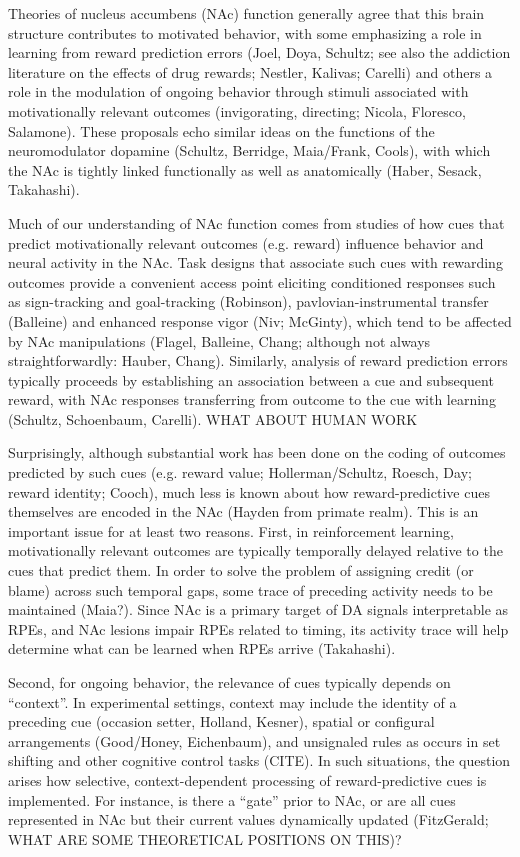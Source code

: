 \documentclass[11pt]{article}
\begin{document}
Theories of nucleus accumbens (NAc) function generally agree that this brain structure contributes to motivated behavior, with some emphasizing a role in learning from reward prediction errors (Joel, Doya, Schultz; see also the addiction literature on the effects of drug rewards; Nestler, Kalivas; Carelli) and others a role in the modulation of ongoing behavior through stimuli associated with motivationally relevant outcomes (invigorating, directing; Nicola, Floresco, Salamone). These proposals echo similar ideas on the functions of the neuromodulator dopamine (Schultz, Berridge, Maia/Frank, Cools), with which the NAc is tightly linked functionally as well as anatomically (Haber, Sesack, Takahashi).

Much of our understanding of NAc function comes from studies of how cues that predict motivationally relevant outcomes (e.g. reward) influence behavior and neural activity in the NAc. Task designs that associate such cues with rewarding outcomes provide a convenient access point eliciting conditioned responses such as sign-tracking and goal-tracking (Robinson), pavlovian-instrumental transfer (Balleine) and enhanced response vigor (Niv; McGinty), which tend to be affected by NAc manipulations (Flagel, Balleine, Chang; although not always straightforwardly: Hauber, Chang). Similarly, analysis of reward prediction errors typically proceeds by establishing an association between a cue and subsequent reward, with NAc responses transferring from outcome to the cue with learning (Schultz, Schoenbaum, Carelli). WHAT ABOUT HUMAN WORK

Surprisingly, although substantial work has been done on the coding of outcomes predicted by such cues (e.g. reward value; Hollerman/Schultz, Roesch, Day; reward identity; Cooch), much less is known about how reward-predictive cues themselves are encoded in the NAc (Hayden from primate realm). This is an important issue for at least two reasons. First, in reinforcement learning, motivationally relevant outcomes are typically temporally delayed relative to the cues that predict them. In order to solve the problem of assigning credit (or blame) across such temporal gaps, some trace of preceding activity needs to be maintained (Maia?). Since NAc is a primary target of DA signals interpretable as RPEs, and NAc lesions impair RPEs related to timing, its activity trace will help determine what can be learned when RPEs arrive (Takahashi).

Second, for ongoing behavior, the relevance of cues typically depends on “context”. In experimental settings, context may include the identity of a preceding cue (occasion setter, Holland, Kesner), spatial or configural arrangements (Good/Honey, Eichenbaum), and unsignaled rules as occurs in set shifting and other cognitive control tasks (CITE). In such situations, the question arises how selective, context-dependent processing of reward-predictive cues is implemented. For instance, is there a “gate” prior to NAc, or are all cues represented in NAc but their current values dynamically updated (FitzGerald; WHAT ARE SOME THEORETICAL POSITIONS ON THIS)? 
\end{document}
